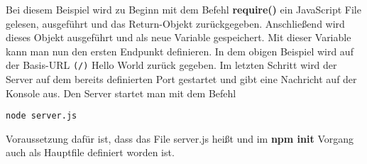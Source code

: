 Bei diesem Beispiel wird zu Beginn mit dem Befehl \textbf{require()} ein JavaScript File gelesen, ausgeführt und das Return-Objekt zurückgegeben. Anschließend wird dieses Objekt ausgeführt und als neue Variable gespeichert. Mit dieser Variable kann man nun den ersten Endpunkt definieren. In dem obigen Beispiel wird auf der Basis-URL \verb|(/)| Hello World zurück gegeben. Im letzten Schritt wird der Server auf dem bereits definierten Port gestartet und gibt eine Nachricht auf der Konsole aus. Den Server startet man mit dem Befehl
\begin{verbatim}
node server.js
\end{verbatim}
Voraussetzung dafür ist, dass das File server.js heißt und im \textbf{npm init} Vorgang auch als Hauptfile definiert worden ist.
\newline
\cite{creating_basic_server}
